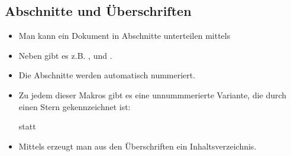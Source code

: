 \subsection{Abschnitte und Überschriften}

\begin{frame}[fragile]{\subsecname}
    \begin{itemize}
        \item Man kann ein Dokument in \alert{Abschnitte} unterteilen mittels
            \begin{center}
            \end{center}
        \item Neben \code{\section} gibt es z.B. \code{\chapter}, \code{\subsection} und
            \code{\paragraph}.
        \item Die Abschnitte werden automatisch nummeriert.
        \item Zu jedem dieser Makros gibt es eine unnummmerierte Variante, die durch einen Stern
            gekennzeichnet ist:
            \begin{center}
                \code{\section*} statt \code{\section}
            \end{center}
        \item Mittels \code{\tableofcontents} erzeugt man aus den Überschriften ein
            \alert{Inhaltsverzeichnis}.
    \end{itemize}
\end{frame}
